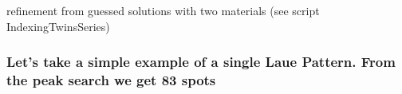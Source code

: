 \documentclass[letterpaper,10pt,english]{sphinxmanual}
\begin{document}
refinement from guessed solutions with two materials (see script
IndexingTwinsSeries)


\subsubsection{Let’s take a simple example of a single Laue Pattern. From the peak search we get 83 spots}
\label{\detokenize{Indexation:let-s-take-a-simple-example-of-a-single-laue-pattern-from-the-peak-search-we-get-83-spots}}
%
\begin{sphinxVerbatim}[commandchars=\\\{\}]
 
\end{sphinxVerbatim}

%
\begin{sphinxVerbatim}[commandchars=\\\{\}]
  
\end{sphinxVerbatim}
\end{document}

